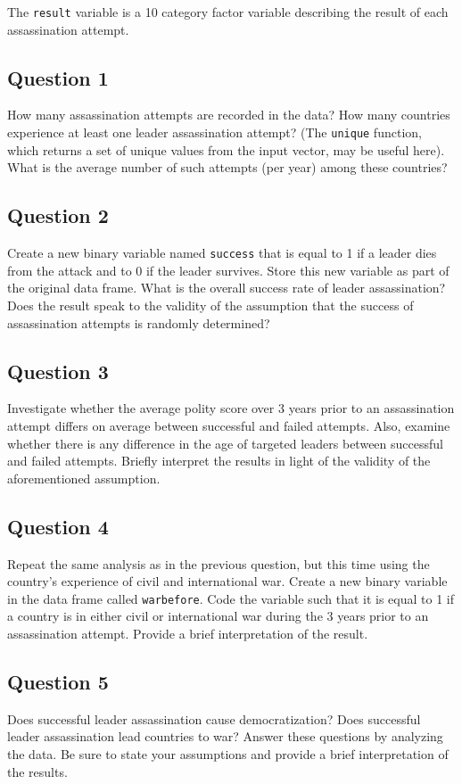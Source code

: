 \documentclass[]{article}
\begin{document}
The \texttt{result} variable is a 10 category factor variable describing
the result of each assassination attempt.

\subsection{Question 1}\label{question-1}

How many assassination attempts are recorded in the data? How many
countries experience at least one leader assassination attempt? (The
\texttt{unique} function, which returns a set of unique values from the
input vector, may be useful here). What is the average number of such
attempts (per year) among these countries?

\subsection{Question 2}\label{question-2}

Create a new binary variable named \texttt{success} that is equal to 1
if a leader dies from the attack and to 0 if the leader survives. Store
this new variable as part of the original data frame. What is the
overall success rate of leader assassination? Does the result speak to
the validity of the assumption that the success of assassination
attempts is randomly determined?

\subsection{Question 3}\label{question-3}

Investigate whether the average polity score over 3 years prior to an
assassination attempt differs on average between successful and failed
attempts. Also, examine whether there is any difference in the age of
targeted leaders between successful and failed attempts. Briefly
interpret the results in light of the validity of the aforementioned
assumption.

\subsection{Question 4}\label{question-4}

Repeat the same analysis as in the previous question, but this time
using the country's experience of civil and international war. Create a
new binary variable in the data frame called \texttt{warbefore}. Code
the variable such that it is equal to 1 if a country is in either civil
or international war during the 3 years prior to an assassination
attempt. Provide a brief interpretation of the result.

\subsection{Question 5}\label{question-5}

Does successful leader assassination cause democratization? Does
successful leader assassination lead countries to war? Answer these
questions by analyzing the data. Be sure to state your assumptions and
provide a brief interpretation of the results.
\end{document}
